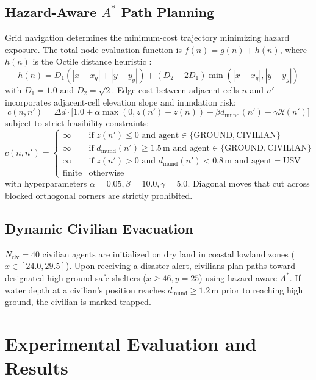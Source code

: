 \documentclass[conference]{IEEEtran}
\begin{document}
\subsection{Hazard-Aware $A^*$ Path Planning}
Grid navigation determines the minimum-cost trajectory minimizing hazard exposure. The total node evaluation function is $f(n) = g(n) + h(n)$, where $h(n)$ is the Octile distance heuristic \cite{hart1968}:
\begin{equation}
h(n) = D_1 (|x - x_g| + |y - y_g|) + (D_2 - 2 D_1) \min(|x - x_g|, |y - y_g|)
\end{equation}
with $D_1 = 1.0$ and $D_2 = \sqrt{2}$. Edge cost between adjacent cells $n$ and $n'$ incorporates adjacent-cell elevation slope and inundation risk:
\begin{equation}
c(n, n') = \Delta d \cdot \Big[1.0 + \alpha \max(0, z(n') - z(n)) + \beta d_{\text{inund}}(n') + \gamma \mathcal{R}(n')\Big]
\end{equation}
subject to strict feasibility constraints:
\begin{equation}
c(n, n') = \begin{cases}
\infty & \text{if } z(n') \le 0 \text{ and } \text{agent} \in \{\text{GROUND}, \text{CIVILIAN}\} \\
\infty & \text{if } d_{\text{inund}}(n') \ge 1.5\,\text{m} \text{ and } \text{agent} \in \{\text{GROUND}, \text{CIVILIAN}\} \\
\infty & \text{if } z(n') > 0 \text{ and } d_{\text{inund}}(n') < 0.8\,\text{m} \text{ and } \text{agent} = \text{USV} \\
\text{finite} & \text{otherwise}
\end{cases}
\end{equation}
with hyperparameters $\alpha = 0.05, \beta = 10.0, \gamma = 5.0$. Diagonal moves that cut across blocked orthogonal corners are strictly prohibited.

\subsection{Dynamic Civilian Evacuation}
$N_{\text{civ}} = 40$ civilian agents are initialized on dry land in coastal lowland zones ($x \in [24.0, 29.5]$). Upon receiving a disaster alert, civilians plan paths toward designated high-ground safe shelters ($x \ge 46, y = 25$) using hazard-aware $A^*$. If water depth at a civilian's position reaches $d_{\text{inund}} \ge 1.2$\,m prior to reaching high ground, the civilian is marked trapped.

\section{Experimental Evaluation and Results}
\end{document}
